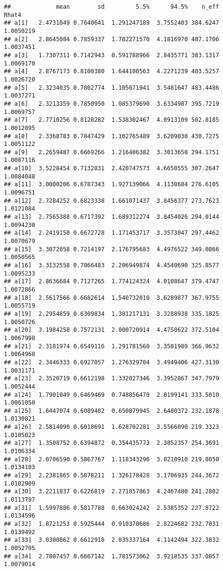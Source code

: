 \documentclass[
]{article}
\begin{document}
\begin{verbatim}
##             mean        sd         5.5%      94.5%    n_eff     Rhat4
## a[1]   2.4731049 0.7640641  1.291247189  3.7552403 384.6247 1.0050219
## a[2]   2.8645084 0.7859337  1.702271570  4.1816970 407.1706 1.0037451
## a[3]   1.7307311 0.7142943  0.591788966  2.8435771 383.1317 1.0069170
## a[4]   2.8767173 0.8100380  1.644100563  4.2271239 403.5257 1.0026720
## a[5]   2.3234035 0.7802774  1.105071941  3.5481647 483.4486 1.0037271
## a[6]   2.3213359 0.7850950  1.085379690  3.6334987 395.7219 1.0069757
## a[7]   2.7710256 0.8120282  1.538302467  4.0913109 502.8185 1.0012895
## a[8]   2.3368783 0.7847429  1.102765489  3.6209030 430.7275 1.0051122
## a[9]   2.2659487 0.6669266  1.216406382  3.3013650 294.1751 1.0087116
## a[10]  3.5228454 0.7132831  2.420747573  4.6650555 307.2647 1.0084048
## a[11]  3.0000206 0.6787343  1.927139066  4.1138684 276.6105 1.0096751
## a[12]  2.7284252 0.6823338  1.661071437  3.8456377 273.7623 1.0121084
## a[13]  2.7565388 0.6717392  1.689312274  3.8454026 294.0144 1.0094230
## a[14]  2.2419150 0.6672728  1.171453717  3.3573047 297.4462 1.0070679
## a[15]  3.3072058 0.7214197  2.176795683  4.4976522 349.0866 1.0050565
## a[16]  3.3132558 0.7066483  2.206949874  4.4540690 325.8577 1.0095233
## a[17]  2.8636684 0.7127265  1.774124324  4.0108647 379.4747 1.0072866
## a[18]  2.5617566 0.6682614  1.540732010  3.6289877 367.9755 1.0055719
## a[19]  2.2954859 0.6309834  1.301217131  3.3288938 335.1825 1.0050726
## a[20]  3.1984258 0.7572131  2.000720914  4.4750622 372.5104 1.0067998
## a[21]  2.3181974 0.6549116  1.291781560  3.3501989 366.9632 1.0064968
## a[22]  2.3446333 0.6927057  1.276329704  3.4949406 427.3130 1.0031171
## a[23]  2.3520719 0.6612198  1.332027346  3.3952867 347.7979 1.0052444
## a[24]  1.7901049 0.6469469  0.748856470  2.8199141 333.5010 1.0061050
## a[25]  1.6447074 0.6089402  0.650879945  2.6480372 232.1878 1.0130821
## a[26]  2.5814090 0.6018691  1.628702281  3.5566090 219.3323 1.0105023
## a[27]  1.3508752 0.6394872  0.354435773  2.3852357 254.3691 1.0106334
## a[28]  2.0706590 0.5867767  1.118343296  3.0210910 219.8050 1.0134103
## a[29]  2.2381865 0.5878211  1.326178428  3.1706935 244.3672 1.0102909
## a[30]  3.2211837 0.6226819  2.271857863  4.2467480 241.2802 1.0113797
## a[31]  1.5997886 0.5817788  0.663024242  2.5385352 227.8722 1.0134596
## a[32]  1.8721253 0.5925444  0.910370686  2.8224682 232.7031 1.0139492
## a[33]  3.0300862 0.6612918  2.035337164  4.1142494 322.3832 1.0052705
## a[34]  2.7807457 0.6667142  1.781573062  3.9218535 337.0857 1.0079014

\end{verbatim}
\end{document}
